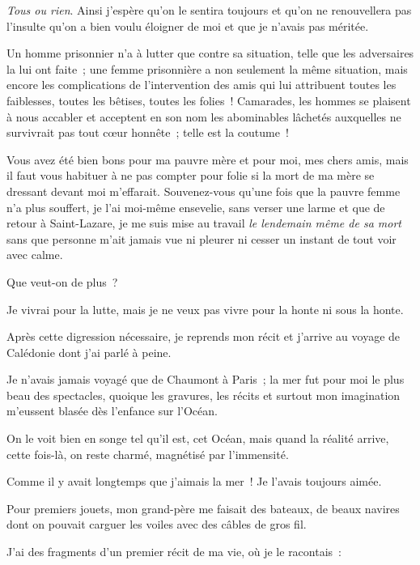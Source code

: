 \documentclass[french,twoside]{book} %
\newcommand{\signed}[1]{\bigbreak\filbreak{\raggedleft #1\par}\medskip}
\begin{document}
\signed{L. M}
\noindent \emph{Tous ou rien}. Ainsi j’espère qu’on le sentira  toujours et qu’on ne renouvellera pas l’insulte qu’on a bien voulu éloigner de moi et que je n’avais pas méritée.\par
Un homme prisonnier n’a à lutter que contre sa situation, telle que les adversaires la lui ont faite ; une femme prisonnière a non seulement la même situation, mais encore les complications de l’intervention des amis qui lui attribuent toutes les faiblesses, toutes les bêtises, toutes les folies ! Camarades, les hommes se plaisent à nous accabler et acceptent en son nom les abominables lâchetés auxquelles ne survivrait pas tout cœur honnête ; telle est la coutume !\par
Vous avez été bien bons pour ma pauvre mère et pour moi, mes chers amis, mais il faut vous habituer à ne pas compter pour folie si la mort de ma mère se dressant devant moi m’effarait. Souvenez-vous qu’une fois que la pauvre femme n’a plus souffert, je l’ai moi-même ensevelie, sans verser une larme et que de retour à Saint-Lazare, je me suis mise au travail \emph{le lendemain même de sa mort} sans que personne m’ait jamais vue ni pleurer ni cesser un instant de tout voir avec calme.\par
Que veut-on de plus ?\par
Je vivrai pour la lutte, mais je ne veux pas vivre pour la honte ni sous la honte.\par
 Après cette digression nécessaire, je reprends mon récit et j’arrive au voyage de Calédonie dont j’ai parlé à peine.\par
Je n’avais jamais voyagé que de Chaumont à Paris ; la mer fut pour moi le plus beau des spectacles, quoique les gravures, les récits et surtout mon imagination m’eussent blasée dès l’enfance sur l’Océan.\par
On le voit bien en songe tel qu’il est, cet Océan, mais quand la réalité arrive, cette fois-là, on reste charmé, magnétisé par l’immensité.\par
Comme il y avait longtemps que j’aimais la mer ! Je l’avais toujours aimée.\par
Pour premiers jouets, mon grand-père me faisait des bateaux, de beaux navires dont on pouvait carguer les voiles avec des câbles de gros fil.\par
J’ai des fragments d’un premier récit de ma vie, où je le racontais :\par
\end{document}
